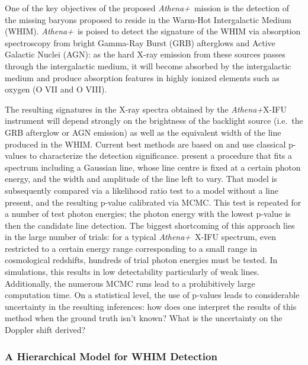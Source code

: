 \documentclass[12pt]{emulateapj}
\newcommand{\project}[1]{\textsl{#1}}
\newcommand{\athena}{\project{Athena+}}
\begin{document}
One of the key objectives of the proposed \athena\ mission is the detection of the missing baryons proposed to reside in the Warm-Hot Intergalactic Medium (WHIM). \athena\ is poised to detect the signature of the WHIM via absorption spectroscopy from bright Gamma-Ray Burst (GRB) afterglows and Active Galactic Nuclei (AGN): as the hard X-ray emission from these sources passes through the intergalactic medium, it will become absorbed by the intergalactic medium and produce absorption features in highly ionized elements such as oxygen (O VII and O VIII). 

The resulting signatures in the X-ray spectra obtained by the \athena X-IFU instrument will depend strongly on the brightness of the backlight source (i.e.\ the GRB afterglow or AGN emission) as well as the equivalent width of the line produced in the WHIM. Current best methods are based on \citep{protassov2002} and use classical p-values to characterize the detection significance. \citep{brand2016} present a procedure that fits a spectrum including a Gaussian line, whose line centre is fixed at a certain photon energy, and the width and amplitude of the line left to vary. That model is subsequently compared via a likelihood ratio test to a model without a line present, and the resulting p-value calibrated via MCMC. This test is repeated for a number of test photon energies; the photon energy with the lowest p-value is then the candidate line detection. The biggest shortcoming of this approach lies in the large number of trials: for a typical \athena\ X-IFU spectrum, even restricted to a certain energy range corresponding to a small range in cosmological redshifts, hundreds of trial photon energies must be tested. In simulations, this results in low detectability particularly of weak lines. Additionally, the numerous MCMC runs lead to a prohibitively large computation time. On a statistical level, the use of p-values leads to considerable uncertainty in the resulting inferences: how does one interpret the results of this method when the ground truth isn't known? What is the uncertainty on the Doppler shift derived? 

\subsubsection{A Hierarchical Model for WHIM Detection}
\end{document}
